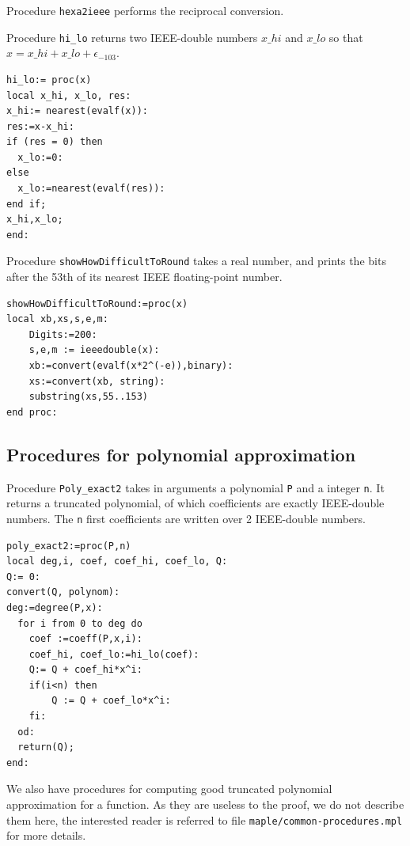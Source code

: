 Procedure \texttt{hexa2ieee} performs the reciprocal conversion.





Procedure \texttt{hi\_lo} returns two IEEE-double numbers $x\_hi$ and
$x\_lo$ so that $x = x\_hi + x\_lo + \epsilon_{-103}$.

\begin{lstlisting}[caption={hi\_lo},firstnumber=1]
hi_lo:= proc(x)
local x_hi, x_lo, res:
x_hi:= nearest(evalf(x)):
res:=x-x_hi:
if (res = 0) then
  x_lo:=0:
else
  x_lo:=nearest(evalf(res)):
end if;
x_hi,x_lo;
end:
\end{lstlisting}
\vspace{0.5cm}




Procedure \texttt{showHowDifficultToRound} takes a real number, and prints
the bits after the 53th of its nearest IEEE floating-point number.


\begin{lstlisting}[caption={showHowDifficultToRound},firstnumber=1]
showHowDifficultToRound:=proc(x)
local xb,xs,s,e,m:
    Digits:=200:
    s,e,m := ieeedouble(x):
    xb:=convert(evalf(x*2^(-e)),binary):
    xs:=convert(xb, string):
    substring(xs,55..153)
end proc:
\end{lstlisting}


\subsection{Procedures for polynomial approximation}


Procedure \texttt{Poly\_exact2} takes in arguments a polynomial
\texttt{P} and a integer \texttt{n}. It returns a truncated
polynomial, of which coefficients are exactly IEEE-double numbers. The
\texttt{n} first coefficients are written over 2 IEEE-double numbers.

\begin{lstlisting}[caption={poly\_exact2},firstnumber=1]
poly_exact2:=proc(P,n)
local deg,i, coef, coef_hi, coef_lo, Q:
Q:= 0:
convert(Q, polynom):
deg:=degree(P,x):
  for i from 0 to deg do
    coef :=coeff(P,x,i):
    coef_hi, coef_lo:=hi_lo(coef):
    Q:= Q + coef_hi*x^i:
    if(i<n) then
        Q := Q + coef_lo*x^i:
    fi:
  od:
  return(Q);
end:
\end{lstlisting}
\vspace{0.5cm}


We also have procedures for computing good truncated polynomial
approximation for a function. As they are useless to the proof, we do
not describe them here, the interested reader is referred to file
\texttt{maple/common-procedures.mpl} for more details.











